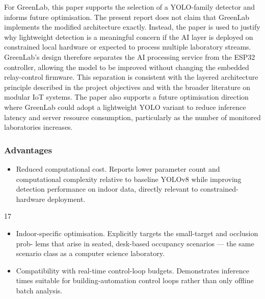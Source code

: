 For GreenLab, this paper supports the selection of a YOLO-family detector and informs future optimisation. The present report does not claim that GreenLab implements the
modiﬁed architecture exactly. Instead, the paper is used to justify why lightweight detection is a meaningful concern if the AI layer is deployed on constrained local hardware or
expected to process multiple laboratory streams. GreenLab's design therefore separates the
AI processing service from the ESP32 controller, allowing the model to be improved without changing the embedded relay-control ﬁrmware. This separation is consistent with the
layered architecture principle described in the project objectives and with the broader literature on modular IoT systems. The paper also supports a future optimisation direction where
GreenLab could adopt a lightweight YOLO variant to reduce inference latency and server
resource consumption, particularly as the number of monitored laboratories increases.




\subsubsection*{Advantages}



\begin{itemize}
  \item Reduced computational cost. Reports lower parameter count and computational
complexity relative to baseline YOLOv8 while improving detection performance on
indoor data, directly relevant to constrained-hardware deployment.
\end{itemize}

17


\begin{itemize}
  \item Indoor-speciﬁc optimisation. Explicitly targets the small-target and occlusion prob-
lems that arise in seated, desk-based occupancy scenarios --- the same scenario class
as a computer science laboratory.
\end{itemize}



\begin{itemize}
  \item Compatibility with real-time control-loop budgets. Demonstrates inference times
suitable for building-automation control loops rather than only ofﬂine batch analysis.
\end{itemize}





